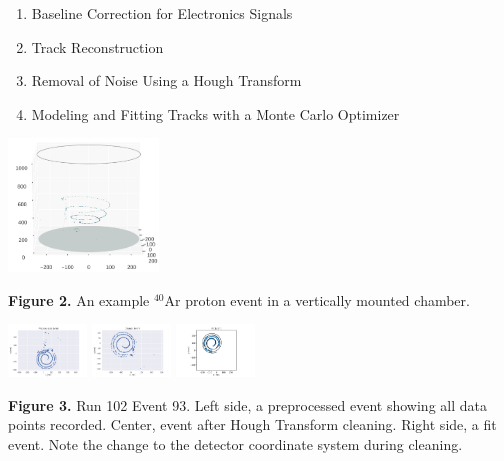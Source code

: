 \documentclass[a0paper,portrait]{baposter}
\begin{document}
\begin{poster}
{{\begin{enumerate}
\item Baseline Correction for Electronics Signals
\item Track Reconstruction
\item Removal of Noise Using a Hough Transform
\item Modeling and Fitting Tracks with a Monte Carlo Optimizer
\end{enumerate}

\begin{center}
\includegraphics[width=40mm]{chamber_plot.png}
\end{center}

\textbf{Figure 2.} An example $^{40}$Ar proton event in a vertically mounted chamber.

\begin{center}
\includegraphics [width=21mm] {preprocess_evt.pdf}
\hspace{.3cm}
\includegraphics [width=21mm] {clean_evt.pdf}
\hspace{.3cm}
\includegraphics [width=21mm] {fit_evt.pdf}
\end{center}

\textbf{Figure 3.} Run 102 Event 93. Left side, a preprocessed event showing all data points recorded. Center, event after Hough Transform cleaning. Right side, a fit event. Note the change to the detector coordinate system during cleaning.}

} 

\end{poster}
\end{document}
